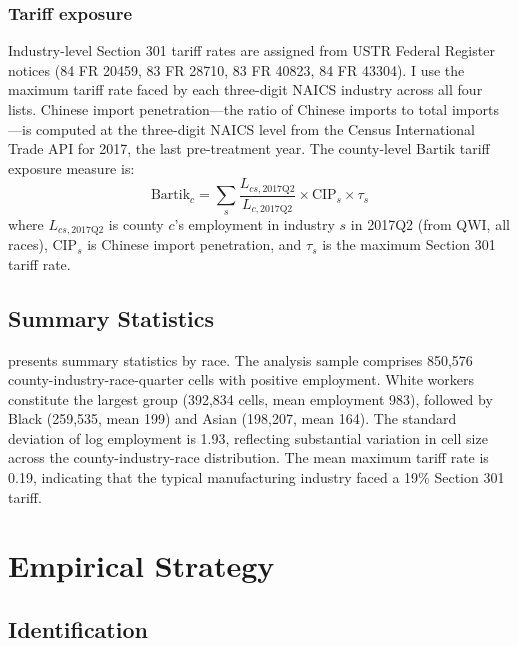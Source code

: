 \documentclass[12pt]{article}
\begin{document}
\subsubsection*{Tariff exposure} Industry-level Section 301 tariff rates are assigned from USTR Federal Register notices (84 FR 20459, 83 FR 28710, 83 FR 40823, 84 FR 43304). I use the maximum tariff rate faced by each three-digit NAICS industry across all four lists. Chinese import penetration---the ratio of Chinese imports to total imports---is computed at the three-digit NAICS level from the Census International Trade API for 2017, the last pre-treatment year. The county-level Bartik tariff exposure measure is:
\begin{equation}\label{eq:bartik}
\text{Bartik}_{c} = \sum_{s} \frac{L_{cs,2017\text{Q2}}}{L_{c,2017\text{Q2}}} \times \text{CIP}_{s} \times \tau_{s}
\end{equation}
where $L_{cs,2017\text{Q2}}$ is county $c$'s employment in industry $s$ in 2017Q2 (from QWI, all races), $\text{CIP}_{s}$ is Chinese import penetration, and $\tau_{s}$ is the maximum Section 301 tariff rate.

\subsection{Summary Statistics}

 presents summary statistics by race. The analysis sample comprises 850,576 county-industry-race-quarter cells with positive employment. White workers constitute the largest group (392,834 cells, mean employment 983), followed by Black (259,535, mean 199) and Asian (198,207, mean 164). The standard deviation of log employment is 1.93, reflecting substantial variation in cell size across the county-industry-race distribution. The mean maximum tariff rate is 0.19, indicating that the typical manufacturing industry faced a 19\% Section 301 tariff.






\section{Empirical Strategy}\label{sec:strategy}

\subsection{Identification}
\end{document}
